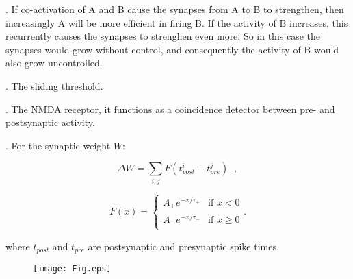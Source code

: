 \documentclass[a4paper,12pt]{article}
\begin{document}
. If co-activation of A and B cause the synapses from A to B to strengthen, then increasingly A will be more efficient in firing B. If the activity of B increases, this recurrently causes the synapses to strenghen even more. So in this case the synapses would grow without control, and consequently the activity of B would also grow uncontrolled.

. The sliding threshold.

. The NMDA receptor, it functions as a coincidence detector between pre- and postsynaptic activity.

. For the synaptic weight $W$:

$$
\Delta W = \sum_{i,j}F(t^i_{post}-t^j_{pre})\;\; ,
$$

$$
 F(x) = 
\begin{cases} 
A_+e^{-x/\tau_+} &\mbox{if } x< 0 \\
A_-e^{-x/\tau_-} &\mbox{if } x\geq 0 \\
\end{cases}
.
$$

where $t_{post}$ and $t_{pre}$ are postsynaptic and presynaptic spike times. 


\begin{figure}[h]
\begin{centering}
\texttt{[image: Fig.eps]}
\end{centering}
\end{figure}
\end{document}
